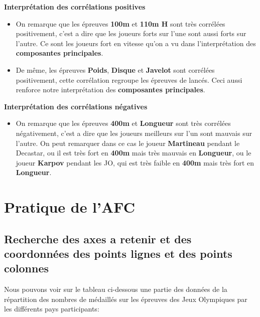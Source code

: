 \documentclass{article}
\begin{document}
\begin{flushleft}
\textbf{Interprétation des corrélations positives}
\end{flushleft}

\begin{itemize}
\item On remarque que les épreuves \textbf{100m} et \textbf{110m H} sont très corrélées positivement, c'est a dire que les joueurs forts sur l'une sont aussi forts sur l'autre. Ce sont les joueurs fort en vitesse qu'on a vu dans l'interprétation des \textbf{composantes principales}.
\item De même, les épreuves \textbf{Poids}, \textbf{Disque} et \textbf{Javelot} sont corrélées positivement, cette corrélation regroupe les épreuves de lancés. Ceci aussi renforce notre interprétation des \textbf{composantes principales}.
\end{itemize}

\begin{flushleft}
\textbf{Interprétation des corrélations négatives}
\end{flushleft}

\begin{itemize}
\item On remarque que les épreuves \textbf{400m} et \textbf{Longueur} sont très corrélées négativement, c'est a dire que les joueurs meilleurs sur l'un sont mauvais sur l'autre. On peut remarquer dans ce cas le joueur \textbf{Martineau} pendant le Decastar, ou il est très fort en \textbf{400m} mais très mauvais en \textbf{Longueur}, ou le joueur \textbf{Karpov} pendant les JO, qui est très faible en \textbf{400m} mais très fort en \textbf{Longueur}.
\end{itemize}

\newpage

\section{Pratique de l'AFC}
\subsection{Recherche des axes a retenir et des coordonnées des points lignes et des points colonnes}

Nous pouvons voir sur le tableau ci-dessous une partie des données de la répartition des nombres de médaillés sur les épreuves des Jeux Olympiques par les différents pays participants:
\end{document}
